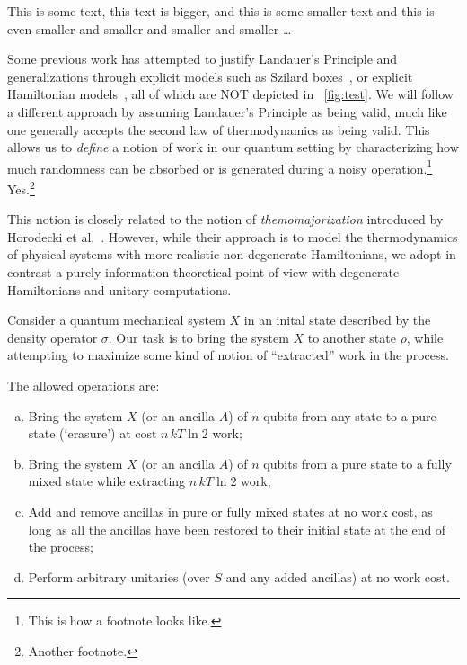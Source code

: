 \documentclass[10pt,letterpaper]{article}
\theoremstyle{plain}
\begin{document}
This is some text, {\notesmaller[1.2] this text is bigger, {\notesmaller[0.8] and this is
    some smaller text {\notesmaller and this is even smaller {\notesmaller and smaller
        {\notesmaller and smaller {\notesmaller and smaller \ldots}}}}}}

Some previous work has attempted to justify Landauer's Principle and generalizations
through explicit models such as Szilard
boxes~\cite{Szilard1929ZeitschriftFuerPhysik,Dahlsten2011NJP_inadequacy}, or explicit
Hamiltonian models~\cite{Alicki2004_hamiltonian}, all of which are NOT depicted in
\figurename~\ref{fig:test}. We will follow a different approach by assuming Landauer's
Principle as being valid, much like one generally accepts the second law of thermodynamics
as being valid. This allows us to {\em define} a notion of work in our quantum setting by
characterizing how much randomness can be absorbed or is generated during a noisy
operation.\footnote{This is how a footnote looks like.} Yes.\footnote{Another footnote.}

This notion is closely related to the notion of {\em themomajorization} introduced by
Horodecki et al.~\cite{Horodecki2013_ThermoMaj}. However, while their approach is to model
the thermodynamics of physical systems with more realistic non-degenerate Hamiltonians, we
adopt in contrast a purely information-theoretical point of view with degenerate
Hamiltonians and unitary computations.

Consider a quantum mechanical system $X$ in an inital state described by the density operator $\sigma$.
Our task is to bring the system $X$ to another state $\rho$, while attempting to maximize some kind of notion
of ``extracted'' work in the process.

The allowed operations are:
\begin{enumerate}[(a)]
\item Bring the system $X$ (or an ancilla $A$) of $n$ qubits from any state to a pure state (`erasure') at
  cost $n\,kT\ln 2$ work;
\item Bring the system $X$ (or an ancilla $A$) of $n$ qubits from a pure state to a fully mixed state while
  extracting $n\,kT\ln 2$ work;
\item Add and remove ancillas in pure or fully mixed states at no work cost, as long as all the ancillas have
  been restored to their initial state at the end of the process;
\item Perform arbitrary unitaries (over $S$ and any added ancillas) at no work cost.
\end{enumerate}
\end{document}
